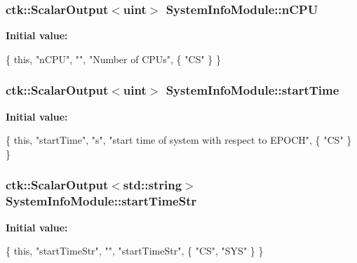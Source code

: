 \subsubsection[{\texorpdfstring{n\+C\+PU}{nCPU}}]{\setlength{\rightskip}{0pt plus 5cm}ctk\+::\+Scalar\+Output$<$uint$>$ System\+Info\+Module\+::n\+C\+PU}\hypertarget{classSystemInfoModule_af46e027d37fc80b6ac87726baf19f23c}{}\label{classSystemInfoModule_af46e027d37fc80b6ac87726baf19f23c}
{\bfseries Initial value\+:}
\begin{DoxyCode}
\{ \textcolor{keyword}{this}, \textcolor{stringliteral}{"nCPU"}, \textcolor{stringliteral}{""}, \textcolor{stringliteral}{"Number of CPUs"},
    \{ \textcolor{stringliteral}{"CS"} \} \}
\end{DoxyCode}
\subsubsection[{\texorpdfstring{start\+Time}{startTime}}]{\setlength{\rightskip}{0pt plus 5cm}ctk\+::\+Scalar\+Output$<$uint$>$ System\+Info\+Module\+::start\+Time}\hypertarget{classSystemInfoModule_a8fc100cd4fbe0e18338b4a4ed6b8bb79}{}\label{classSystemInfoModule_a8fc100cd4fbe0e18338b4a4ed6b8bb79}
{\bfseries Initial value\+:}
\begin{DoxyCode}
\{ \textcolor{keyword}{this}, \textcolor{stringliteral}{"startTime"}, \textcolor{stringliteral}{"s"}, \textcolor{stringliteral}{"start time of system with respect to EPOCH"},
      \{ \textcolor{stringliteral}{"CS"} \} \}
\end{DoxyCode}
\subsubsection[{\texorpdfstring{start\+Time\+Str}{startTimeStr}}]{\setlength{\rightskip}{0pt plus 5cm}ctk\+::\+Scalar\+Output$<$std\+::string$>$ System\+Info\+Module\+::start\+Time\+Str}\hypertarget{classSystemInfoModule_ad924ec0d32245d1426556770918c9f55}{}\label{classSystemInfoModule_ad924ec0d32245d1426556770918c9f55}
{\bfseries Initial value\+:}
\begin{DoxyCode}
\{ \textcolor{keyword}{this}, \textcolor{stringliteral}{"startTimeStr"}, \textcolor{stringliteral}{""}, \textcolor{stringliteral}{"startTimeStr"},
        \{ \textcolor{stringliteral}{"CS"}, \textcolor{stringliteral}{"SYS"} \} \}
\end{DoxyCode}
